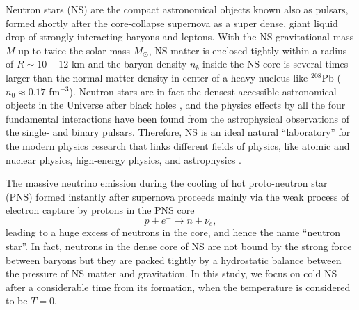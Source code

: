 
Neutron stars (\gls{NS}) are the compact astronomical objects known also as pulsars, 
formed shortly after the core-collapse supernova as a super dense, giant liquid drop 
of strongly interacting baryons and leptons. With the NS gravitational mass $M$ up to 
twice the solar mass $M_\odot$, NS matter is enclosed tightly within a radius of 
$R\sim 10-12$ km and the baryon density $n_b$ inside the NS core is several times 
larger than the normal matter density in center of a heavy nucleus like 
$^{208}$Pb ($n_0 \approx 0.17$ fm$^{-3}$). 
Neutron stars are in fact the densest accessible astronomical objects in the Universe 
after black holes \citep{baym1975neutron}, and the physics effects by all the four 
fundamental interactions have been found from the astrophysical observations 
of the single- and binary pulsars. Therefore, NS is an ideal natural ``laboratory'' 
for the modern physics research that links different fields of physics, like atomic
and nuclear physics, high-energy physics, and astrophysics \citep{lattimer2004physics}.

The massive neutrino emission during the cooling of hot proto-neutron star (PNS) formed 
instantly after supernova proceeds mainly via the weak process of electron capture 
by protons in the PNS core   
\begin{equation}
        p + e^- \to n + \nu_e,
\end{equation}
leading to a huge excess of neutrons in the core, and hence the name ``neutron star''.
In fact, neutrons in the dense core of NS are not bound by the strong force between baryons 
but they are packed tightly by a hydrostatic balance between the pressure of NS matter
and gravitation. In this study, we focus on cold \gls{NS} after a considerable time 
from its formation, when the temperature is considered to be $T=0$.

